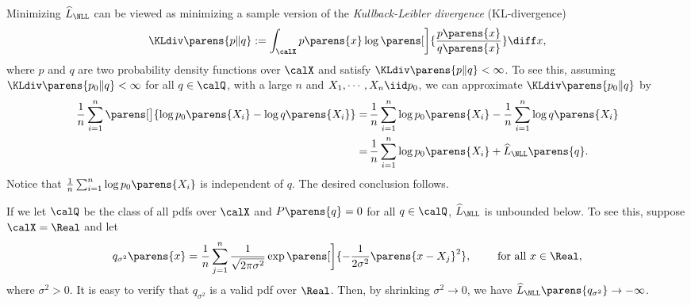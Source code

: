 \documentclass[12pt]{article}
\theoremstyle{definition}
\theoremstyle{theorem}
\theoremstyle{remark}
\begin{document}
Minimizing $\widehat{L}_{\NLL}$ can be viewed as minimizing a sample version of the \textit{Kullback-Leibler divergence} (KL-divergence) 
\begin{align}
	\KLdiv \parens{p \Vert q} := \int_{\calX} p \parens{x} \log \parens[\bigg]{\frac{p \parens{x}}{q \parens{x}}} \diff x, 
\end{align}
where $p$ and $q$ are two probability density functions over $\calX$ and satisfy $\KLdiv \parens{p \Vert q} < \infty$. To see this, assuming $\KLdiv \parens{p_0 \Vert q} < \infty$ for all $q \in \calQ$, with a large $n$ and $X_1, \cdots, X_n \iid p_0$, we can approximate $\KLdiv \parens{p_0 \Vert q}$ by 
\begin{align*}
	\frac{1}{n} \sum_{i=1}^n \parens[\big]{\log p_0 \parens{X_i} - \log q \parens{X_i}} = & \, \frac{1}{n} \sum_{i=1}^n \log p_0 \parens{X_i} - \frac{1}{n} \sum_{i=1}^n \log q \parens{X_i} \\ 
	= & \,  \frac{1}{n} \sum_{i=1}^n \log p_0 \parens{X_i} + \widehat{L}_{\NLL} \parens{q}. 
\end{align*}
Notice that $\frac{1}{n} \sum_{i=1}^n \log p_0 \parens{X_i}$ is independent of $q$. The desired conclusion follows. 

If we let $\calQ$ be the class of all pdfs over $\calX$ and $P \parens{q} = 0$ for all $q \in \calQ$, $\widehat{L}_{\NLL}$ is unbounded below. To see this, suppose $\calX = \Real$ and let 
\begin{align*}
	q_{\sigma^2} \parens{x} = \frac{1}{n} \sum_{j=1}^n \frac{1}{\sqrt{2 \pi \sigma^2}} \exp \parens[\bigg]{-\frac{1}{2\sigma^2} \parens{x - X_j}^2}, \qquad \text{ for all } x \in \Real, 
\end{align*}
where $\sigma^2 > 0$. It is easy to verify that $q_{\sigma^2}$ is a valid pdf over $\Real$. Then, by shrinking $\sigma^2 \to 0$, we have $\widehat{L}_{\NLL} \parens{q_{\sigma^2}} \to - \infty$. 
\end{document}
